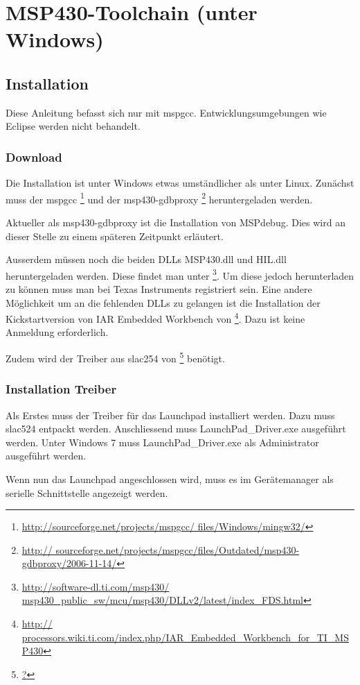 \section{MSP430-Toolchain (unter Windows)}
\subsection{Installation}
Diese Anleitung befasst sich nur mit mspgcc. Entwicklungsumgebungen wie Eclipse 
werden nicht behandelt. 
\subsubsection{Download}
Die Installation ist unter Windows etwas umständlicher als unter Linux. 
Zunächst muss der mspgcc \footnote{\url{http://sourceforge.net/projects/mspgcc/
files/Windows/mingw32/}} und der msp430-gdbproxy \footnote{\url{http://
sourceforge.net/projects/mspgcc/files/Outdated/msp430-gdbproxy/2006-11-14/}} 
heruntergeladen werden. 

Aktueller als msp430-gdbproxy ist die Installation von MSPdebug. Dies wird an 
dieser Stelle zu einem späteren Zeitpunkt erläutert. 

Ausserdem müssen noch die beiden DLLs MSP430.dll und HIL.dll heruntergeladen 
werden. Diese findet man unter \footnote{\url{http://software-dl.ti.com/msp430/
msp430_public_sw/mcu/msp430/DLLv2/latest/index_FDS.html}}. Um diese jedoch 
herunterladen zu können muss man bei Texas Instruments registriert sein. Eine 
andere Möglichkeit um an die fehlenden DLLs zu gelangen ist die Installation 
der Kickstartversion von IAR Embedded Workbench von \footnote{\url{http://
processors.wiki.ti.com/index.php/IAR_Embedded_Workbench_for_TI_MSP430}}. Dazu 
ist keine Anmeldung erforderlich. 

Zudem wird der Treiber aus slac254 von \footnote{\url{?}} benötigt. 

\subsubsection{Installation Treiber}
Als Erstes muss der Treiber für das Launchpad installiert werden. Dazu muss 
slac524 entpackt werden. Anschliessend muss LaunchPad\_Driver.exe ausgeführt 
werden. Unter Windows 7 muss LaunchPad\_Driver.exe als Administrator ausgeführt 
werden. 

Wenn nun das Launchpad angeschlossen wird, muss es im Gerätemanager als 
serielle Schnittstelle angezeigt werden. 



